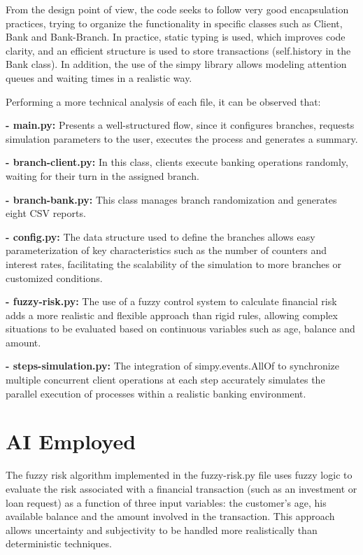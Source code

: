 \documentclass[titlepage, 12pt]{article}
\begin{document}
From the design point of view, the code seeks to follow very good encapsulation practices, trying to organize the functionality in specific classes such as Client, Bank and Bank-Branch. In practice, static typing is used, which improves code clarity, and an efficient structure is used to store transactions (self.history in the Bank class). In addition, the use of the simpy library allows modeling attention queues and waiting times in a realistic way.

Performing a more technical analysis of each file, it can be observed that: 

\textbf{- main.py:} Presents a well-structured flow, since it configures branches, requests simulation parameters to the user, executes the process and generates a summary. 

\textbf{- branch-client.py:} In this class, clients execute banking operations randomly, waiting for their turn in the assigned branch. 

\textbf{- branch-bank.py:} This class manages branch randomization and generates eight CSV reports.

\textbf{- config.py:} The data structure used to define the branches allows easy parameterization of key characteristics such as the number of counters and interest rates, facilitating the scalability of the simulation to more branches or customized conditions.

\textbf{- fuzzy-risk.py:} The use of a fuzzy control system to calculate financial risk adds a more realistic and flexible approach than rigid rules, allowing complex situations to be evaluated based on continuous variables such as age, balance and amount.

\textbf{- steps-simulation.py:} The integration of simpy.events.AllOf to synchronize multiple concurrent client operations at each step accurately simulates the parallel execution of processes within a realistic banking environment.

\newpage

\section{AI Employed}
The fuzzy risk algorithm implemented in the fuzzy-risk.py file uses fuzzy logic to evaluate the risk associated with a financial transaction (such as an investment or loan request) as a function of three input variables: the customer's age, his available balance and the amount involved in the transaction. This approach allows uncertainty and subjectivity to be handled more realistically than deterministic techniques.
\end{document}
